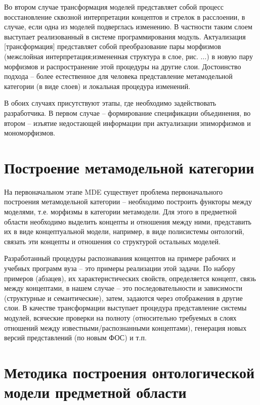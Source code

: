\documentclass[12pt,a4paper]{extarticle}
\begin{document}
Во втором случае трансформация моделей представляет собой процесс восстановление
сквозной интерпретации концептов и стрелок в расслоении, в случае, если одна из
моделей подверглась изменению.  В частности таким слоем выступает реализованный
в системе программирования модуль.  Актуализация [трансформация] представляет
собой преобразование пары морфизмов (межслойная интерпретация;измененная
структура в слое, рис. ...) в новую пару морфизмов и распространение этой
процедуры на другие слои.  Достоинство подхода -- более естественное для
человека представление метамодельной категории (в виде слоев) и локальная
процедура изменений.

В обоих случаях присутствуют этапы, где необходимо задействовать разработчика.
В первом случае -- формирование спецификации объединения, во втором -- изъятие
недостающей информации при актуализации эпиморфизмов и мономорфизмов.

\section{Построение метамодельной категории}
\label{sec:mmod-construction}

На первоначальном этапе MDE существует проблема первоначального построения
метамодельной категории -- необходимо построить функторы между моделями, т.е.
морфизмы в категории метамодели.  Для этого в предметной области необходимо
выделить концепты и отношения между ними, представить их в виде концептуальной
модели, например, в виде полисистемы онтологий, связать эти концепты и отношения
со структурой остальных моделей.

Разработанный процедуры распознавания концептов на примере рабочих и учебных
программ вуза -- это примеры реализации этой задачи.  По набору примеров
(абзацев), их характеристических свойств, определяется концепт, связь между
концептами, в нашем случае -- это последовательности и зависимости (структурные
и семантические), затем, задаются через отображения в другие слои.  В качестве
трансформации выступает процедура представление системы модулей, всяческие
проверки на полноту (относительно требуемых в слоях отношений между
известными/распознанными концептами), генерация новых версий представлений (по
новым ФОС) и т.п.

\section{Методика построения онтологической модели предметной области}
\label{sec:technique-onto}
\end{document}
